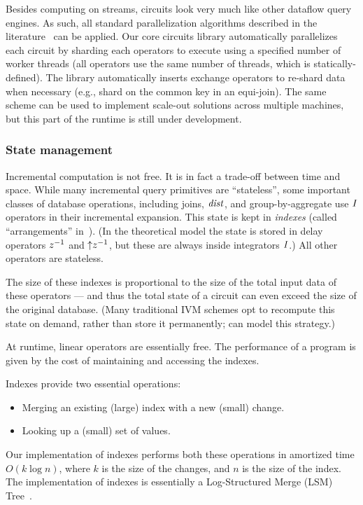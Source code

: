Besides computing on streams, \dbsp circuits look very much like other
dataflow query engines.  As such, all standard parallelization
algorithms described in the literature~\cite{Graefe-sigmod90} can be
applied.  Our core circuits library automatically parallelizes each
circuit by sharding each operators to execute using a specified number
of worker threads (all operators use the same number of threads, which
is statically-defined).  The library automatically inserts exchange
operators to re-shard data when necessary (e.g., shard on the common
key in an equi-join).  The same scheme can be used to implement
scale-out solutions across multiple machines, but this part of the
runtime is still under development.

\subsubsection{State management}\label{sec:state-management}

Incremental computation is not free.  It is in fact a trade-off
between time and space.  While many incremental query primitives are
``stateless'', some important classes of database operations,
including joins, $\mathit{dist}$, and group-by-aggregate use $\mathit{I}$
operators in their incremental expansion.  This state is kept in
\emph{indexes} (called ``arrangements'' in~\cite{mcsherry-vldb20}).
(In the \dbsp theoretical model the state is stored in delay
operators $z^{-1}$ and ${\uparrow}z^{-1}$, but these are always inside
integrators $\mathit{I}$.)  All other operators are stateless.

The size of these indexes is proportional to the size of the total
input data of these operators --- and thus the total state of a
circuit can even exceed the size of the original database.  (Many
traditional IVM schemes opt to recompute this state on demand, rather
than store it permanently; \dbsp can model this strategy.)

At runtime, linear operators are essentially free.  The performance of
a \dbsp program is given by the cost of maintaining and
accessing the indexes.

Indexes provide two essential operations:
\begin{itemize}
\item Merging an existing (large) index with a new (small) change.
\item Looking up a (small) set of values.
\end{itemize}

Our implementation of indexes performs both these operations in
amortized time $O(k \log n)$, where $k$ is the size of the changes,
and $n$ is the size of the index.  The implementation of indexes is
essentially a Log-Structured Merge (LSM) Tree~\cite{oneil-ai96}.

